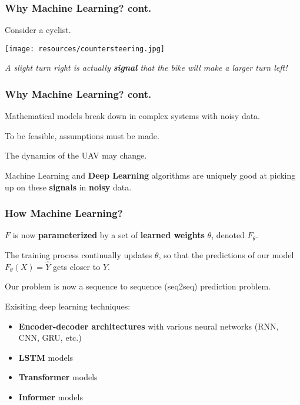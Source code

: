 \documentclass{beamer}
\begin{document}
\begin{frame}
    \frametitle{Why Machine Learning? cont.}

    Consider a cyclist.
    
    \centering
    \texttt{[image: resources/countersteering.jpg]}

    \emph{A slight turn right is actually \textbf{signal} that the bike will
    make a larger turn left!}
\end{frame}

\begin{frame}
    \frametitle{Why Machine Learning? cont.}

    Mathematical models break down in complex systems with noisy data.

    To be feasible, assumptions must be made.

    The dynamics of the UAV may change.

    Machine Learning and \textbf{Deep Learning} algorithms are uniquely good 
    at picking up on these \textbf{signals} in \textbf{noisy} data.
\end{frame}

\begin{frame}
    \frametitle{How Machine Learning?}

    $F$ is now \textbf{parameterized} by a set of \textbf{learned weights}
    $\theta$, denoted $F_\theta$.

    The training process continually updates $\theta$, so that the predictions 
    of our model $F_\theta(X) = \hat{Y}$ gets closer to $Y$.

    \pause
    Our problem is now a \alert{sequence to sequence} (seq2seq) prediction problem.
    
    Exisiting deep learning techniques:
    \begin{itemize}
        \item {
            \textbf{Encoder-decoder architectures} with various neural networks 
            (RNN, CNN, GRU, etc.)
        }
        \item {
            \textbf{LSTM} models
        }
        \item {
            \textbf{Transformer} models
        }
        \item {
            \textbf{Informer} models
        }
    \end{itemize}
\end{frame}
\end{document}
